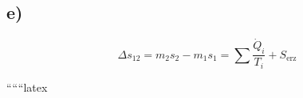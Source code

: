 

\subsection*{e)}

\[
\Delta s_{12} = m_2 s_2 - m_1 s_1 = \sum \frac{\dot{Q}_i}{T_i} + S_{\text{erz}}
\]

``````latex
